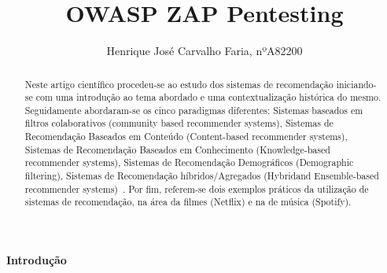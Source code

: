%
\title{OWASP ZAP Pentesting}
%
%
\author{Henrique José Carvalho Faria, nºA82200}
%
%
%
\maketitle              %
%
\begin{abstract}
Neste artigo científico procedeu-se ao estudo dos sistemas de recomendação iniciando-se com uma introdução ao tema abordado e uma contextualização histórica do mesmo. Seguidamente abordaram-se os cinco paradigmas diferentes: Sistemas baseados em filtros colaborativos (community based recommender systems), Sistemas de Recomendação Baseados em Conteúdo (Content-based recommender systems), Sistemas de Recomendação Baseados em Conhecimento
(Knowledge-based recommender systems), Sistemas de Recomendação Demográficos (Demographic filtering), Sistemas de Recomendação híbridos/Agregados (Hybridand Ensemble-based recommender systems)~\cite{ref_book1}. Por fim, referem-se dois exemplos práticos da utilização de sistemas de recomendação, na área da filmes (Netflix) e na de música (Spotify).\newline

\end{abstract}
%
%
\begin{center}
\normalsize{\bfseries Introdução}\hfill 
\end{center}







